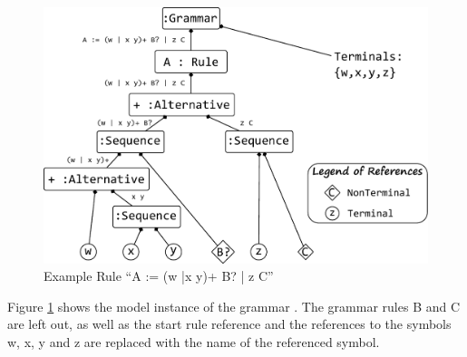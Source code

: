 \begin{figure}
\centering
\includegraphics[scale=0.7]{gfx/ex/grammarExample} 
\caption{Example Rule ``A := (w |x y)+ B? | z C''}
\label{MM:GrammarExample}
\end{figure}
\FloatBarrier

Figure \ref{MM:GrammarExample} shows the model instance of the grammar  . The grammar rules B and C are left out, as well as the start rule reference and the references to the symbols w, x, y and z are replaced with the name of the referenced symbol.


